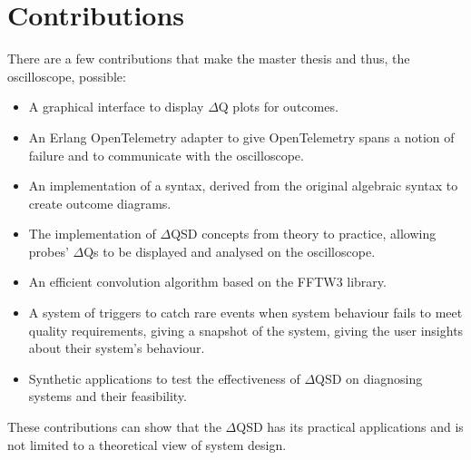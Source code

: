 \section{Contributions}
    There are a few contributions that make the master thesis and thus, the oscilloscope, possible:
    \begin{itemize}
        \item A graphical interface to display $\Delta$Q plots for outcomes.
        \item An Erlang OpenTelemetry adapter to give OpenTelemetry spans a notion of failure and to communicate with the oscilloscope.
        \item An implementation of a syntax, derived from the original algebraic syntax to create outcome diagrams. 
        \item The implementation of $\Delta$QSD concepts from theory to practice, allowing probes' $\Delta$Qs to be displayed and analysed on the oscilloscope.
        \item An efficient convolution algorithm based on the FFTW3 library.
        \item A system of triggers to catch rare events when system behaviour fails to meet quality requirements, giving a snapshot of the system, giving the user insights about their system's behaviour.
        \item Synthetic applications to test the effectiveness of $\Delta$QSD on diagnosing systems and their feasibility.
    \end{itemize}
    These contributions can show that the $\Delta$QSD has its practical applications and is not limited to a theoretical view of system design.

